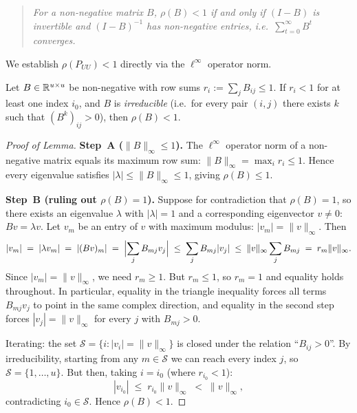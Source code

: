 \begin{notechapter}
\begin{quote}
\emph{For a non-negative matrix $B$, $\rho(B) < 1$ if and only if
$(I - B)$ is invertible and $(I-B)^{-1}$ has non-negative entries, i.e.\
$\sum_{t=0}^\infty B^t$ converges.}
\end{quote}

We establish $\rho(P_{UU}) < 1$ directly via the $\ell^\infty$ operator norm.

\begin{lemma}
Let $B \in \mathbb{R}^{u \times u}$ be non-negative with row sums
$r_i := \sum_j B_{ij} \leq 1$.  If $r_i < 1$ for at least one index $i_0$,
and $B$ is \emph{irreducible} (i.e.\ for every pair $(i,j)$ there exists $k$
such that $(B^k)_{ij} > 0$), then $\rho(B) < 1$.
\end{lemma}

\begin{proof}[Proof of Lemma]
\textbf{Step~A ($\|B\|_\infty \leq 1$).}
The $\ell^\infty$ operator norm of a non-negative matrix equals its maximum row
sum: $\|B\|_\infty = \max_i r_i \leq 1$.  Hence every eigenvalue satisfies
$|\lambda| \leq \|B\|_\infty \leq 1$, giving $\rho(B) \leq 1$.

\textbf{Step~B (ruling out $\rho(B) = 1$).}
Suppose for contradiction that $\rho(B)=1$, so there exists an eigenvalue
$\lambda$ with $|\lambda|=1$ and a corresponding eigenvector $v \neq 0$:
$Bv = \lambda v$.  Let $v_m$ be an entry of $v$ with maximum modulus:
$|v_m| = \|v\|_\infty$.  Then
\[
  |v_m| \;=\; |\lambda v_m| \;=\; |(Bv)_m|
  \;=\; \Bigl|\sum_j B_{mj} v_j\Bigr|
  \;\leq\; \sum_j B_{mj}|v_j|
  \;\leq\; \|v\|_\infty \sum_j B_{mj}
  \;=\; r_m \|v\|_\infty.
\]
Since $|v_m| = \|v\|_\infty$, we need $r_m \geq 1$.  But $r_m \leq 1$, so
$r_m = 1$ and equality holds throughout.  In particular, equality in the
triangle inequality forces all terms $B_{mj}v_j$ to point in the same complex
direction, and equality in the second step forces $|v_j| = \|v\|_\infty$
for every $j$ with $B_{mj} > 0$.

Iterating: the set $\mathcal{S} = \{i : |v_i| = \|v\|_\infty\}$ is closed
under the relation ``$B_{ij} > 0$''.  By irreducibility, starting from any
$m \in \mathcal{S}$ we can reach every index $j$, so $\mathcal{S} = \{1,
\ldots, u\}$.  But then, taking $i = i_0$ (where $r_{i_0} < 1$):
\[
  |v_{i_0}| \;\leq\; r_{i_0}\|v\|_\infty \;<\; \|v\|_\infty,
\]
contradicting $i_0 \in \mathcal{S}$.  Hence $\rho(B) < 1$.
\end{proof}


\end{notechapter}
